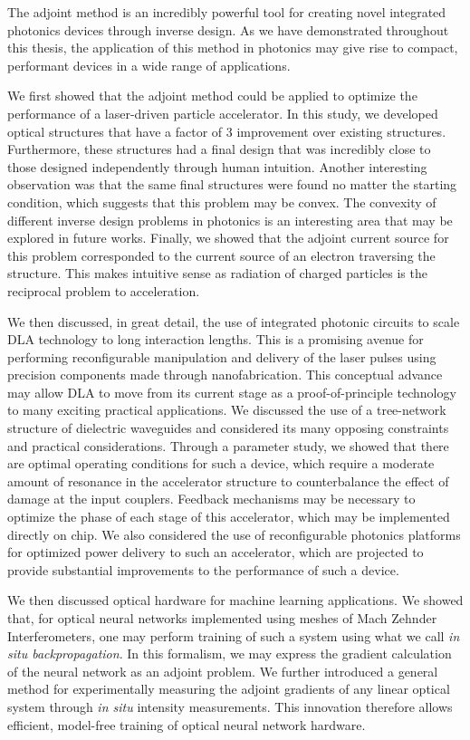 
The adjoint method is an incredibly powerful tool for creating novel integrated photonics devices through inverse design.
As we have demonstrated throughout this thesis, the application of this method in photonics may give rise to compact, performant devices in a wide range of applications.

We first showed that the adjoint method could be applied to optimize the performance of a laser-driven particle accelerator.
In this study, we developed optical structures that have a factor of 3 improvement over existing structures.
Furthermore, these structures had a final design that was incredibly close to those designed independently through human intuition.
Another interesting observation was that the same final structures were found no matter the starting condition, which suggests that this problem may be convex.
The convexity of different inverse design problems in photonics is an interesting area that may be explored in future works.
Finally, we showed that the adjoint current source for this problem corresponded to the current source of an electron traversing the structure.
This makes intuitive sense as radiation of charged particles is the reciprocal problem to acceleration.

We then discussed, in great detail, the use of integrated photonic circuits to scale DLA technology to long interaction lengths.
This is a promising avenue for performing reconfigurable manipulation and delivery of the laser pulses using precision components made through nanofabrication.
This conceptual advance may allow DLA to move from its current stage as a proof-of-principle technology to many exciting practical applications.
We discussed the use of a tree-network structure of dielectric waveguides and considered its many opposing constraints and practical considerations.
Through a parameter study, we showed that there are optimal operating conditions for such a device, which require a moderate amount of resonance in the accelerator structure to counterbalance the effect of damage at the input couplers.
Feedback mechanisms may be necessary to optimize the phase of each stage of this accelerator, which may be implemented directly on chip.
We also considered the use of reconfigurable photonics platforms for optimized power delivery to such an accelerator, which are projected to provide substantial improvements to the performance of such a device.

We then discussed optical hardware for machine learning applications.
We showed that, for optical neural networks implemented using meshes of Mach Zehnder Interferometers, one may perform training of such a system using what we call \textit{in situ backpropagation}.  In this formalism, we may express the gradient calculation of the neural network as an adjoint problem.
We further introduced a general method for experimentally measuring the adjoint gradients of any linear optical system through \textit{in situ} intensity measurements.
This innovation therefore allows efficient, model-free training of optical neural network hardware.

